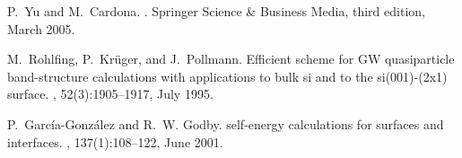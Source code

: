 \documentclass[aps,prb,10pt,showpacs,letterpaper,twocolumn]{revtex4-1}
\begin{document}
\begin{thebibliography}{10}
P.~Yu and M.~Cardona.
.
\newblock Springer Science \& Business Media, third edition, March 2005.

M.~Rohlfing, P.~Kr{\"u}ger, and J.~Pollmann.
\newblock Efficient scheme for {GW} quasiparticle band-structure calculations
  with applications to bulk si and to the si(001)-(2x1) surface.
, 52(3):1905--1917, July 1995.

P.~Garc{\'i}a-Gonz{\'a}lez and R.~W. Godby.
 self-energy calculations for surfaces and interfaces.
, 137(1):108--122, June 2001.

\end{thebibliography}
\end{document}
